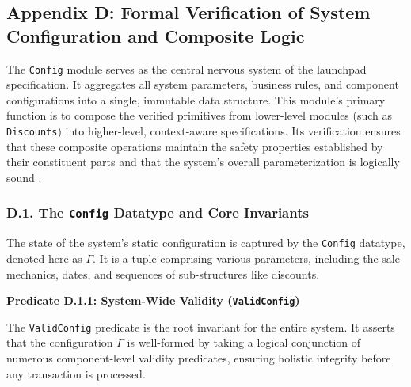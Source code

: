 \documentclass[
  english,
  onecolumn]{article}
\begin{document}
\subsection{Appendix D: Formal Verification of System Configuration and
Composite
Logic}\label{appendix-d-formal-verification-of-system-configuration-and-composite-logic}

The \texttt{Config} module serves as the central nervous system of the
launchpad specification. It aggregates all system parameters, business
rules, and component configurations into a single, immutable data
structure. This module's primary function is to compose the verified
primitives from lower-level modules (such as \texttt{Discounts}) into
higher-level, context-aware specifications. Its verification ensures
that these composite operations maintain the safety properties
established by their constituent parts and that the system's overall
parameterization is logically sound
.

\subsubsection{\texorpdfstring{D.1. The \texttt{Config} Datatype and
Core
Invariants}{D.1. The Config Datatype and Core Invariants}}\label{d.1.-the-config-datatype-and-core-invariants}

The state of the system's static configuration is captured by the
\texttt{Config} datatype, denoted here as \(\Gamma\). It is a tuple
comprising various parameters, including the sale mechanics, dates, and
sequences of sub-structures like discounts.

\textbf{Predicate D.1.1: System-Wide Validity (\texttt{ValidConfig})}

The \texttt{ValidConfig} predicate is the root invariant for the entire
system. It asserts that the configuration \(\Gamma\) is well-formed by
taking a logical conjunction of numerous component-level validity
predicates, ensuring holistic integrity before any transaction is
processed.
\end{document}
